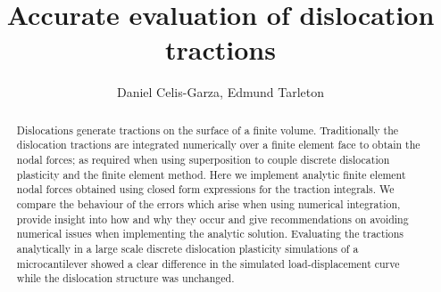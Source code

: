 \documentclass[11pt]{iopart}
\begin{document}
\title{Accurate evaluation of dislocation tractions}
\author[]{Daniel Celis-Garza, Edmund Tarleton}


\address{Department of Materials, University of Oxford, Parks Road, OX1 3PH, UK}

\begin{abstract}
    Dislocations generate tractions on the surface of a finite volume. Traditionally the dislocation tractions are integrated numerically over a finite element face to obtain the nodal forces; as required when using superposition to couple discrete dislocation plasticity and the finite element method. Here we implement analytic finite element nodal forces obtained using closed form expressions for the traction integrals. We compare the behaviour of the errors which arise when using numerical integration, provide insight into how and why they occur and give recommendations on avoiding numerical issues when implementing the analytic solution. Evaluating the tractions analytically in a large scale discrete dislocation plasticity simulations of a microcantilever showed a clear difference in the simulated load-displacement curve while the dislocation structure was unchanged.
\end{abstract}


\end{document}

